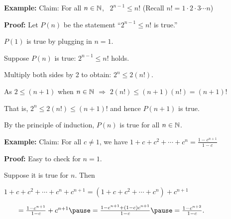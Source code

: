 \documentclass[10pt,aspectratio=149]{beamer}
\begin{document}
\begin{frame}
\textbf{Example:}
Claim: For all $n \in {\mathbb{N}}$, ~$2^{n-1} \leq n!$  \quad (Recall $n! = 1 \cdot 2 \cdot 3 \cdots n$)

\medskip
\pause

\textbf{Proof:}
Let $P(n)$ be the statement ``$2^{n-1} \leq n!$ is true.''

\pause

$P(1)$ is true by plugging in $n=1$.

\pause

Suppose $P(n)$ is true: $2^{n-1} \leq n!$ holds.

\pause
Multiply both sides by 2 to obtain:
$2^n \leq 2(n!)$.

\pause
As $2 \leq (n+1)$ when $n \in {\mathbb{N}}$ \quad $\Rightarrow$ \quad $2(n!) \leq (n+1)(n!) = (n+1)!$

\pause
That is, $2^n \leq 2(n!) \leq  (n+1)!$ and hence $P(n+1)$ is true.

\pause
By the principle of induction, $P(n)$
is true for all $n \in {\mathbb{N}}$.

\medskip
\pause

\textbf{Example:}
Claim: For all $c \not= 1$, we have $1 + c + c^2 + \cdots + c^n = \frac{1-c^{n+1}}{1-c}$

\medskip
\pause

\textbf{Proof:}
Easy to check for $n=1$.

\pause
Suppose it is true for $n$.  Then

\pause
\medskip
$
1 + c + c^2 + \cdots + c^n + c^{n+1}  =
( 1 + c + c^2 + \cdots + c^n ) + c^{n+1}
$

\pause
\medskip
$\qquad = \frac{1-c^{n+1}}{1-c}  + c^{n+1}
\pause
= \frac{1-c^{n+1}  + (1-c)c^{n+1}}{1-c}
\pause
= \frac{1-c^{n+2}}{1-c} .$
\end{frame}

%
%
%
%
\end{document}

